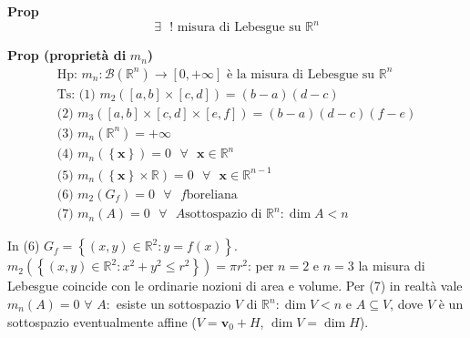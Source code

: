 \documentclass{article}
\begin{document}
\textbf{Prop}%
\begin{equation*}
\exists \text{ }!\text{ misura di Lebesgue su }%
\mathbb{R}
^{n}
\end{equation*}

\textbf{Prop (propriet\`{a} di }$m_{n}$\textbf{)}%
\begin{gather*}
\text{Hp: }m_{n}:\mathcal{B}\left( 
\mathbb{R}
^{n}\right) \rightarrow \left[ 0,+\infty \right] \text{ \`{e} la misura di
Lebesgue su }%
\mathbb{R}
^{n} \\
\text{Ts: (1) }m_{2}\left( \left[ a,b\right] \times \left[ c,d\right]
\right) =\left( b-a\right) \left( d-c\right) \\
\text{(2) }m_{3}\left( \left[ a,b\right] \times \left[ c,d\right] \times %
\left[ e,f\right] \right) =\left( b-a\right) \left( d-c\right) \left(
f-e\right) \\
\text{(3) }m_{n}\left( 
\mathbb{R}
^{n}\right) =+\infty \\
\text{(4) }m_{n}\left( \left\{ \mathbf{x}\right\} \right) =0\text{ }\forall 
\text{ }\mathbf{x}\in 
\mathbb{R}
^{n} \\
\text{(5) }m_{n}\left( \left\{ \mathbf{x}\right\} \times 
\mathbb{R}
\right) =0\text{ }\forall \text{ }\mathbf{x}\in 
\mathbb{R}
^{n-1} \\
\text{(6) }m_{2}\left( G_{f}\right) =0\text{ }\forall \text{ }f\text{
boreliana} \\
\text{(7) }m_{n}\left( A\right) =0\text{ }\forall \text{ }A\text{
sottospazio di }%
\mathbb{R}
^{n}:\dim A<n
\end{gather*}

In (6) $G_{f}=\left\{ \left( x,y\right) \in 
\mathbb{R}
^{2}:y=f\left( x\right) \right\} $. $m_{2}\left( \left\{ \left( x,y\right)
\in 
\mathbb{R}
^{2}:x^{2}+y^{2}\leq r^{2}\right\} \right) =\pi r^{2}$: per $n=2$ e $n=3$ la
misura di Lebesgue coincide con le ordinarie nozioni di area e volume. Per (7) in realt\`{a} vale $m_{n}\left( A\right) =0$ 
$\forall $ $A:$ esiste un sottospazio $V$ di $%
\mathbb{R}
^{n}:\dim V<n$ e $A\subseteq V$, dove $V$ \`{e} un sottospazio eventualmente
affine ($V=\mathbf{v}_{0}+H$, $\dim V=\dim H$).
\end{document}
